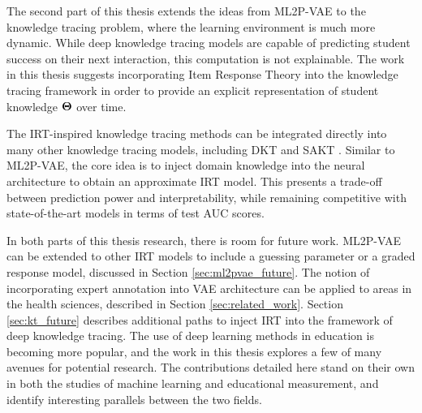 The second part of this thesis extends the ideas from ML2P-VAE to the knowledge tracing problem, where the learning environment is much more dynamic. While deep knowledge tracing models are capable of predicting student success on their next interaction, this computation is not explainable. The work in this thesis suggests incorporating Item Response Theory into the knowledge tracing framework in order to provide an explicit representation of student knowledge $\boldsymbol{\Theta}$ over time.

The IRT-inspired knowledge tracing methods can be integrated directly into many other knowledge tracing models, including DKT \cite{piech2015} and SAKT \cite{pandey2019}. Similar to ML2P-VAE, the core idea is to inject domain knowledge into the neural architecture to obtain an approximate IRT model. This presents a trade-off between prediction power and interpretability, while remaining competitive with state-of-the-art models in terms of test AUC scores.

In both parts of this thesis research, there is room for future work. ML2P-VAE can be extended to other IRT models to include a guessing parameter or a graded response model, discussed in Section \ref{sec:ml2pvae_future}. The notion of incorporating expert annotation into VAE architecture can be applied to areas in the health sciences, described in Section \ref{sec:related_work}. Section \ref{sec:kt_future} describes additional paths to inject IRT into the framework of deep knowledge tracing. The use of deep learning methods in education is becoming more popular, and the work in this thesis explores a few of many avenues for potential research. The contributions detailed here stand on their own in both the studies of machine learning and educational measurement, and identify interesting parallels between the two fields.

